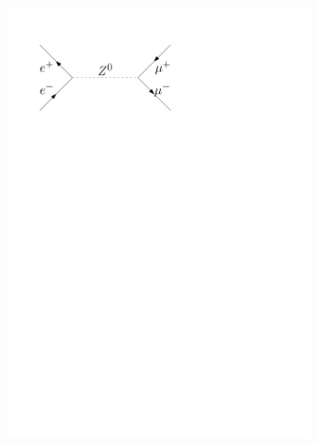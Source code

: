 \documentclass[11pt, a4paper]{article}
\numberwithin{equation}{section}
\begin{document}
\begin{figure}[htb]
\begin{subfigure}{.32\textwidth}
		\includegraphics[width=.9\textwidth]{./figures/theory/feynman/mm}
	\end{subfigure}
	\\
	\vspace{2em}
	\begin{subfigure}{.32\textwidth}
		\centering

\end{subfigure}
\end{figure}
\end{document}
